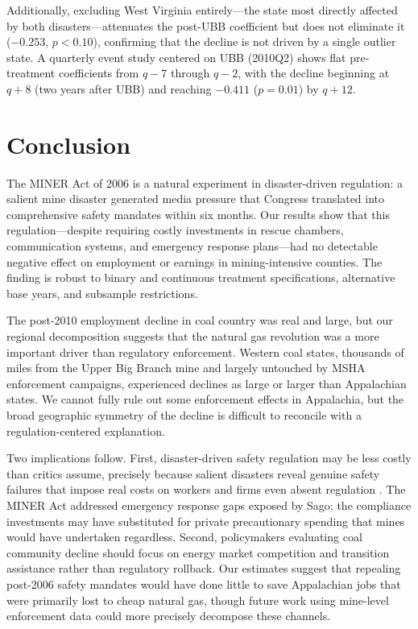 \documentclass[12pt]{article}
\begin{document}
Additionally, excluding West Virginia entirely---the state most directly affected by both disasters---attenuates the post-UBB coefficient but does not eliminate it ($-0.253$, $p < 0.10$), confirming that the decline is not driven by a single outlier state. A quarterly event study centered on UBB (2010Q2) shows flat pre-treatment coefficients from $q-7$ through $q-2$, with the decline beginning at $q+8$ (two years after UBB) and reaching $-0.411$ ($p = 0.01$) by $q+12$.




\section{Conclusion}
\label{sec:conclusion}

The MINER Act of 2006 is a natural experiment in disaster-driven regulation: a salient mine disaster generated media pressure that Congress translated into comprehensive safety mandates within six months. Our results show that this regulation---despite requiring costly investments in rescue chambers, communication systems, and emergency response plans---had no detectable negative effect on employment or earnings in mining-intensive counties. The finding is robust to binary and continuous treatment specifications, alternative base years, and subsample restrictions.

The post-2010 employment decline in coal country was real and large, but our regional decomposition suggests that the natural gas revolution was a more important driver than regulatory enforcement. Western coal states, thousands of miles from the Upper Big Branch mine and largely untouched by MSHA enforcement campaigns, experienced declines as large or larger than Appalachian states. We cannot fully rule out some enforcement effects in Appalachia, but the broad geographic symmetry of the decline is difficult to reconcile with a regulation-centered explanation.

Two implications follow. First, disaster-driven safety regulation may be less costly than critics assume, precisely because salient disasters reveal genuine safety failures that impose real costs on workers and firms even absent regulation \citep{boeri2021survival}. The MINER Act addressed emergency response gaps exposed by Sago; the compliance investments may have substituted for private precautionary spending that mines would have undertaken regardless. Second, policymakers evaluating coal community decline should focus on energy market competition and transition assistance rather than regulatory rollback. Our estimates suggest that repealing post-2006 safety mandates would have done little to save Appalachian jobs that were primarily lost to cheap natural gas, though future work using mine-level enforcement data could more precisely decompose these channels.
\end{document}
